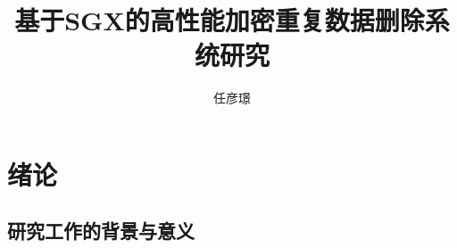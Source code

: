 \documentclass[master]{thesis-uestc}
\title{基于SGX的高性能加密重复数据删除系统研究}{High-Performance Encrypted Data Deduplication System Based on SGX}
\author{任彦璟}{Ren Yanjing}
\begin{document}
\makecover
\originalitydeclaration

\begin{chineseabstract}
\chinesekeyword{}
\end{chineseabstract}

\begin{englishabstract}
\englishkeyword{}
\end{englishabstract}

\thesistableofcontents

\chapter{绪\hspace{6pt}论}

\section{研究工作的背景与意义}

\cite{ren2021accelerating}

\thesisacknowledgement


\thesisappendix

\chapter{}

\section{}




%
% 
%
% 
% 
%


\thesistranslationoriginal
\section{}

\thesistranslationchinese
\section{}
\end{document}

